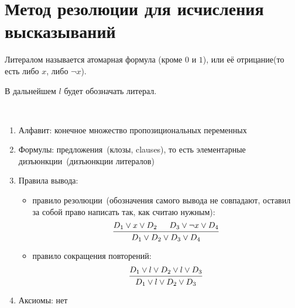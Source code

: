 \documentclass[main]{subfiles}
\begin{document}
\chapter[Метод резолюции]{Метод резолюции для исчисления высказываний}
\begin{definition}[Литерал]
    Литералом называется атомарная формула (кроме $0$ и $1$), или её отрицание(то есть либо $x$, либо $\lnot x$).
\end{definition}
В дальнейшем $l$ будет обозначать литерал.
\begin{definition}
    \

    \begin{enumerate}
        \item Алфавит: конечное множество пропозициональных переменных
        \item Формулы: предложения~(клозы, clauses), то есть элементарные дизъюнкции~(дизъюнкции литералов)
        \item Правила вывода:
              \begin{itemize}
                  \item правило резолюции~(обозначения самого вывода не совпадают, оставил за собой право написать так, как считаю нужным):
                        \begin{gather*}
                            \begin{prooftree}
                                \hypo{D_1 \lor x \lor D_2}
                                \hypo{D_3\lor \lnot x\lor D_4}
                                \infer2{D_1\lor D_2 \lor D_3 \lor D_4}
                            \end{prooftree}
                        \end{gather*}
                  \item правило сокращения повторений:
                        \begin{gather*}
                            \begin{prooftree}
                                \hypo{D_1 \lor l\lor D_2\lor l\lor D_3}
                                \infer1{D_1\lor l\lor D_2\lor D_3}
                            \end{prooftree}
                        \end{gather*}
              \end{itemize}
        \item Аксиомы: нет
    \end{enumerate}
\end{definition}
\end{document}
